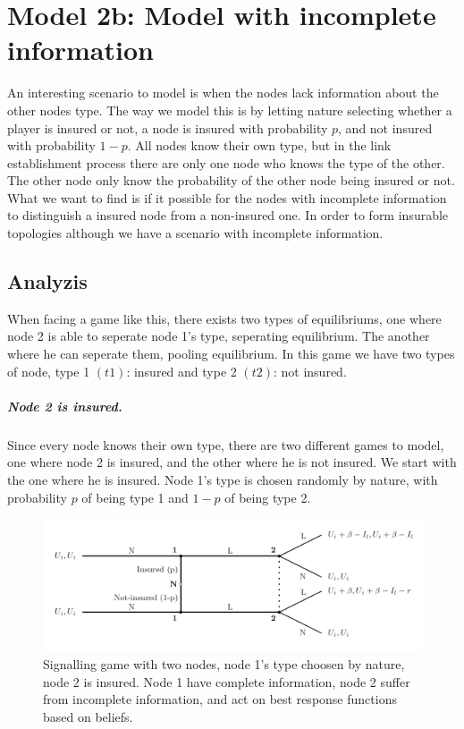 \section{Model 2b: Model with incomplete information}
An interesting scenario to model is when the nodes lack information about the other nodes type. The way we model this is by letting nature selecting whether a player is insured or not, a node is insured with probability $p$, and not insured with probability $1-p$. 
All nodes know their own type, but in the link establishment process there are only one node who knows the type of the other. The other node only know the probability of the other node being insured or not. 
What we want to find is if it possible for the nodes with incomplete information to distinguish a insured node from a non-insured one. In order to form insurable topologies although we have a scenario with incomplete information. 
\subsection{Analyzis}
When facing a game like this, there exists two types of equilibriums, one where node 2 is able to seperate node 1's type, seperating equilibrium. The another where he can seperate them, pooling equilibrium. 
In this game we have two types of node, type 1 $(t1)$: insured and type 2 $(t2)$: not insured. 
\subparagraph{Node 2 is insured.}
Since every node knows their own type, there are two different games to model, one where node 2 is insured, and the other where he is not insured. We start with the one where he is insured.
Node 1's type is chosen randomly by nature, with probability $p$ of being type 1 and $1-p$ of being type 2.
\begin{figure}[h]
\centering
  \centering
\includegraphics[width=1\linewidth]{../Figures/SignalingGameInsured.png}

\caption{Signalling game with two nodes, node 1's type choosen by nature, node 2 is insured. Node 1 have complete information, node 2 suffer from incomplete information, and act on best response functions based on beliefs. \label{fig:signalingInsured}}

\end{figure}

